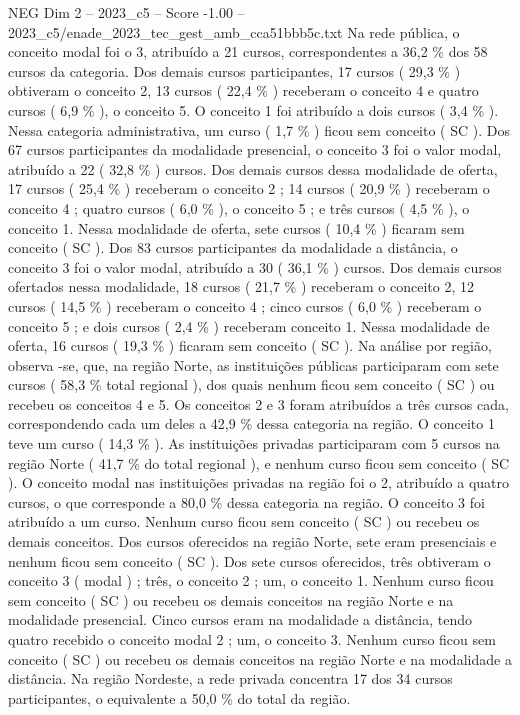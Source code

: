 \begin{textsample}{NEG Dim 2 – 2023\_c5 – Score -1.00 – 2023\_c5/enade\_2023\_tec\_gest\_amb\_cca51bbb5c.txt}
Na rede pública, o conceito modal foi o 3, atribuído a 21 cursos, correspondentes a 36,2 \% dos 58 cursos da categoria.
Dos demais cursos participantes, 17 cursos ( 29,3 \% ) obtiveram o conceito 2, 13 cursos ( 22,4 \% ) receberam o conceito 4 e quatro cursos ( 6,9 \% ), o conceito 5.
O conceito 1 foi atribuído a dois cursos ( 3,4 \% ).
Nessa categoria administrativa, um curso ( 1,7 \% ) ficou sem conceito ( SC ).
Dos 67 cursos participantes da modalidade presencial, o conceito 3 foi o valor modal, atribuído a 22 ( 32,8 \% ) cursos.
Dos demais cursos dessa modalidade de oferta, 17 cursos ( 25,4 \% ) receberam o conceito 2 ; 14 cursos ( 20,9 \% ) receberam o conceito 4 ; quatro cursos ( 6,0 \% ), o conceito 5 ; e três cursos ( 4,5 \% ), o conceito 1.
Nessa modalidade de oferta, sete cursos ( 10,4 \% ) ficaram sem conceito ( SC ).
Dos 83 cursos participantes da modalidade a distância, o conceito 3 foi o valor modal, atribuído a 30 ( 36,1 \% ) cursos.
Dos demais cursos ofertados nessa modalidade, 18 cursos ( 21,7 \% ) receberam o conceito 2, 12 cursos ( 14,5 \% ) receberam o conceito 4 ; cinco cursos ( 6,0 \% ) receberam o conceito 5 ; e dois cursos ( 2,4 \% ) receberam conceito 1.
Nessa modalidade de oferta, 16 cursos ( 19,3 \% ) ficaram sem conceito ( SC ).
Na análise por região, observa -se, que, na região Norte, as instituições públicas participaram com sete cursos ( 58,3 \% total regional ), dos quais nenhum ficou sem conceito ( SC ) ou recebeu os conceitos 4 e 5.
Os conceitos 2 e 3 foram atribuídos a três cursos cada, correspondendo cada um deles a 42,9 \% dessa categoria na região.
O conceito 1 teve um curso ( 14,3 \% ).
As instituições privadas participaram com 5 cursos na região Norte ( 41,7 \% do total regional ), e nenhum curso ficou sem conceito ( SC ).
O conceito modal nas instituições privadas na região foi o 2, atribuído a quatro cursos, o que corresponde a 80,0 \% dessa categoria na região.
O conceito 3 foi atribuído a um curso.
Nenhum curso ficou sem conceito ( SC ) ou recebeu os demais conceitos.
Dos cursos oferecidos na região Norte, sete eram presenciais e nenhum ficou sem conceito ( SC ).
Dos sete cursos oferecidos, três obtiveram o conceito 3 ( modal ) ; três, o conceito 2 ; um, o conceito 1.
Nenhum curso ficou sem conceito ( SC ) ou recebeu os demais conceitos na região Norte e na modalidade presencial.
Cinco cursos eram na modalidade a distância, tendo quatro recebido o conceito modal 2 ; um, o conceito 3.
Nenhum curso ficou sem conceito ( SC ) ou recebeu os demais conceitos na região Norte e na modalidade a distância.
Na região Nordeste, a rede privada concentra 17 dos 34 cursos participantes, o equivalente a 50,0 \% do total da região.

\end{textsample}
